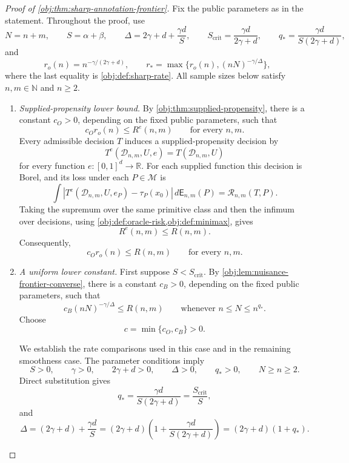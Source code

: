 \begin{proof}[Proof of \cref{obj:thm:sharp-annotation-frontier}]
Fix the public parameters as in the statement. Throughout the proof, use
\[
N=n+m,\qquad S=\alpha+\beta,\qquad
\Delta=2\gamma+d+\frac{\gamma d}{S},\qquad
S_{\mathrm{crit}}=\frac{\gamma d}{2\gamma+d},\qquad
q_*=\frac{\gamma d}{S(2\gamma+d)},
\]
and
\[
r_o(n)=n^{-\gamma/(2\gamma+d)},\qquad
r_*=\max\{r_o(n),(nN)^{-\gamma/\Delta}\},
\]
where the last equality is \cref{obj:def:sharp-rate}. All sample sizes below satisfy \(n,m\in\mathbb N\) and \(n\ge2\).

\begin{enumerate}
\item \emph{Supplied-propensity lower bound.}
By \cref{obj:thm:supplied-propensity}, there is a constant \(c_O>0\), depending on the fixed public parameters, such that
\[
c_O r_o(n)\le R^e(n,m)
\qquad\text{for every }n,m.
\]
Every admissible decision \(T\) induces a supplied-propensity decision by
\[
T^e(\mathcal D_{n,m},U,e)=T(\mathcal D_{n,m},U)
\]
for every function \(e:[0,1]^d\to\mathbb R\). For each supplied function this decision is Borel, and its loss under each \(P\in\mathcal M\) is
\[
\int
\left|T^e(\mathcal D_{n,m},U,e_P)-\tau_P(x_0)\right|
\,d\mathsf E_{n,m}(P)
=
\mathcal R_{n,m}(T,P).
\]
Taking the supremum over the same primitive class and then the infimum over decisions, using \cref{obj:def:oracle-risk,obj:def:minimax}, gives
\[
R^e(n,m)\le R(n,m).
\]
Consequently,
\[
c_O r_o(n)\le R(n,m)
\qquad\text{for every }n,m.
\]

\item \emph{A uniform lower constant.}
First suppose \(S<S_{\mathrm{crit}}\). By
\cref{obj:lem:nuisance-frontier-converse}, there is a constant \(c_B>0\), depending on the fixed public parameters, such that
\[
c_B(nN)^{-\gamma/\Delta}\le R(n,m)
\qquad\text{whenever }n\le N\le n^{q_*}.
\]
Choose
\[
c=\min\{c_O,c_B\}>0.
\]

We establish the rate comparisons used in this case and in the remaining smoothness case. The parameter conditions imply
\[
S>0,\qquad \gamma>0,\qquad 2\gamma+d>0,\qquad
\Delta>0,\qquad q_*>0,\qquad N\ge n\ge2.
\]
Direct substitution gives
\[
q_*=
\frac{\gamma d}{S(2\gamma+d)}
=
\frac{S_{\mathrm{crit}}}{S},
\]
and
\[
\Delta
=
(2\gamma+d)+\frac{\gamma d}{S}
=
(2\gamma+d)
\left(1+\frac{\gamma d}{S(2\gamma+d)}\right)
=
(2\gamma+d)(1+q_*).
\]


\end{enumerate}
\end{proof}
